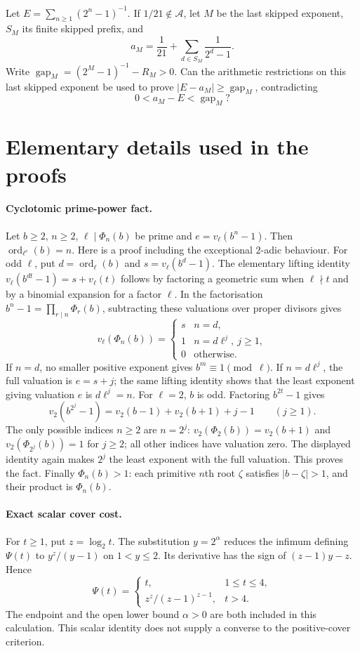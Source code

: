 \documentclass[11pt]{article}
\newcommand{\Ach}{\mathcal A}
\begin{document}
\begin{problem}\label{prob:fatal-interval}
Let $E=\sum_{n\ge1}(2^n-1)^{-1}$.  If $1/21\notin\Ach$, let $M$ be the last
skipped exponent, $S_M$ its finite skipped prefix, and
\[
 a_M=\frac1{21}+\sum_{d\in S_M}\frac1{2^d-1}.
\]
Write $\operatorname{gap}_M=(2^M-1)^{-1}-R_M>0$.
Can the arithmetic restrictions on this last skipped exponent be used to
prove $|E-a_M|\ge\operatorname{gap}_M$, contradicting
\[
 0<a_M-E<\operatorname{gap}_M?
\]
\end{problem}


\section{Elementary details used in the proofs}\label{app:elementary-details}
\paragraph{Cyclotomic prime-power fact.}
Let $b\ge2$, $n\ge2$, $\ell\mid\Phi_n(b)$ be prime and
$e=v_\ell(b^n-1)$.  Then $\operatorname{ord}_{\ell^e}(b)=n$.
Here is a proof including the exceptional $2$-adic behaviour.
For odd $\ell$, put $d=\operatorname{ord}_{\ell}(b)$ and
$s=v_\ell(b^d-1)$.  The elementary lifting identity
$v_\ell(b^{dt}-1)=s+v_\ell(t)$ follows by factoring a geometric sum
when $\ell\nmid t$ and by a binomial expansion for a factor $\ell$.
In the factorisation $b^n-1=\prod_{r\mid n}\Phi_r(b)$, subtracting
these valuations over proper divisors gives
\[
 v_\ell(\Phi_n(b))=
 \begin{cases}s&n=d,\\1&n=d\ell^j,\ j\ge1,\\0&\text{otherwise.}\end{cases}
\]
If $n=d$, no smaller positive exponent gives $b^m\equiv1\pmod\ell$.
If $n=d\ell^j$, the full valuation is $e=s+j$; the same lifting
identity shows that the least exponent giving valuation $e$ is
$d\ell^j=n$.
For $\ell=2$, $b$ is odd.  Factoring $b^{2t}-1$ gives
\[
 v_2(b^{2^j}-1)=v_2(b-1)+v_2(b+1)+j-1\qquad(j\ge1).
\]
The only possible indices $n\ge2$ are $n=2^j$:
$v_2(\Phi_2(b))=v_2(b+1)$ and
$v_2(\Phi_{2^j}(b))=1$ for $j\ge2$; all other indices have
valuation zero.  The displayed identity again makes $2^j$ the least
exponent with the full valuation.  This proves the fact.
Finally $\Phi_n(b)>1$: each primitive $n$th root $\zeta$ satisfies
$|b-\zeta|>1$, and their product is $\Phi_n(b)$.

\paragraph{Exact scalar cover cost.}
For $t\ge1$, put $z=\log_2t$.  The substitution $y=2^\alpha$
reduces the infimum defining $\Psi(t)$ to $y^z/(y-1)$ on $1<y\le2$.
Its derivative has the sign of $(z-1)y-z$.  Hence
\[
 \Psi(t)=
 \begin{cases}t,&1\le t\le4,\\
 z^z/(z-1)^{z-1},&t>4.
 \end{cases}
\]
The endpoint and the open lower bound $\alpha>0$ are both included in this
calculation.  This scalar identity does not supply a converse to the
positive-cover criterion.
\end{document}
